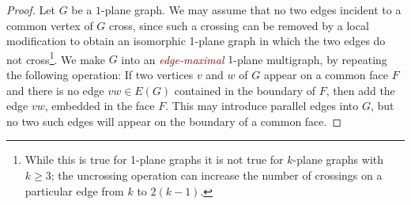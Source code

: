 \documentclass{patmorin}
\theoremstyle{plain}
\theoremstyle{definition}
\newcommand{\defin}[1]{\textcolor{Maroon}{\emph{#1}}}
\renewcommand{\ge}{\geqslant}
\begin{document}
\begin{proof}
Let $G$ be a $1$-plane graph. We may assume that no two edges incident to a common vertex of $G$ cross, since such a crossing can be removed by a local modification to obtain an isomorphic 1-plane graph in which the two edges do not cross\footnote{While this is true for 1-plane graphs it is not true for $k$-plane graphs with $k\ge 3$; the uncrossing operation can increase the number of crossings on a particular edge from $k$ to $2(k-1)$.}.
We make $G$ into an \defin{edge-maximal} $1$-plane multigraph, by repeating the following operation:  If two vertices $v$ and $w$ of $G$ appear on a common face $F$ and there is no edge $vw\in E(G)$ contained in the boundary of $F$, then add the edge $vw$, embedded in the face $F$.  This may introduce parallel edges into $G$, but no two such edges will appear on the boundary of a common face.


\end{proof}
\end{document}
